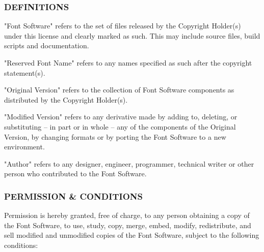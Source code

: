 \documentclass[a4paper, 12pt]{article}
\begin{document}
\subsubsection{DEFINITIONS}

"Font Software" refers to the set of files released by the Copyright
Holder(s) under this license and clearly marked as such. This may
include source files, build scripts and documentation.

"Reserved Font Name" refers to any names specified as such after the
copyright statement(s).

"Original Version" refers to the collection of Font Software components as
distributed by the Copyright Holder(s).

"Modified Version" refers to any derivative made by adding to, deleting,
or substituting -- in part or in whole -- any of the components of the
Original Version, by changing formats or by porting the Font Software to a
new environment.

"Author" refers to any designer, engineer, programmer, technical
writer or other person who contributed to the Font Software.

\subsubsection{PERMISSION \& CONDITIONS}

Permission is hereby granted, free of charge, to any person obtaining
a copy of the Font Software, to use, study, copy, merge, embed, modify,
redistribute, and sell modified and unmodified copies of the Font
Software, subject to the following conditions:
\end{document}
